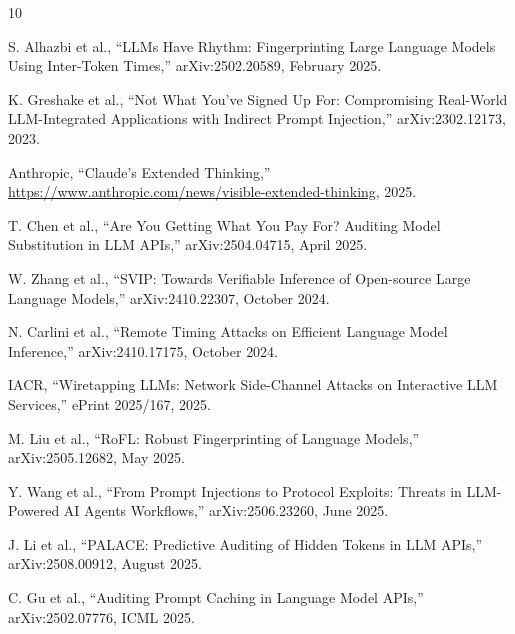 \documentclass[11pt,a4paper]{article}
\begin{document}

\begin{thebibliography}{10}

S. Alhazbi et al., ``LLMs Have Rhythm: Fingerprinting Large Language Models Using Inter-Token Times,'' arXiv:2502.20589, February 2025.

K. Greshake et al., ``Not What You've Signed Up For: Compromising Real-World LLM-Integrated Applications with Indirect Prompt Injection,'' arXiv:2302.12173, 2023.

Anthropic, ``Claude's Extended Thinking,'' \url{https://www.anthropic.com/news/visible-extended-thinking}, 2025.

T. Chen et al., ``Are You Getting What You Pay For? Auditing Model Substitution in LLM APIs,'' arXiv:2504.04715, April 2025.

W. Zhang et al., ``SVIP: Towards Verifiable Inference of Open-source Large Language Models,'' arXiv:2410.22307, October 2024.

N. Carlini et al., ``Remote Timing Attacks on Efficient Language Model Inference,'' arXiv:2410.17175, October 2024.

IACR, ``Wiretapping LLMs: Network Side-Channel Attacks on Interactive LLM Services,'' ePrint 2025/167, 2025.

M. Liu et al., ``RoFL: Robust Fingerprinting of Language Models,'' arXiv:2505.12682, May 2025.

Y. Wang et al., ``From Prompt Injections to Protocol Exploits: Threats in LLM-Powered AI Agents Workflows,'' arXiv:2506.23260, June 2025.

J. Li et al., ``PALACE: Predictive Auditing of Hidden Tokens in LLM APIs,'' arXiv:2508.00912, August 2025.

C. Gu et al., ``Auditing Prompt Caching in Language Model APIs,'' arXiv:2502.07776, ICML 2025.

\end{thebibliography}
\end{document}
